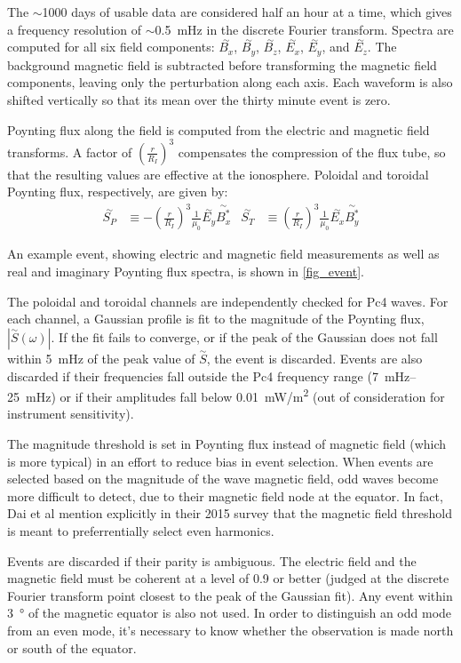 \documentclass{article}
\newcommand{\about}{\ensuremath{\sim}}
\newcommand{\dft}[1]{\ensuremath{\overset{\sim}{#1}}\xspace}
\newcommand{\lr}[1]{ \left( #1 \right) }
\renewcommand{\arg}[1]{\!\lr{#1}}
\newcommand{\mz}{\ensuremath{\mu_0}\xspace}
\begin{document}
The \about1000 days of usable data are considered half an hour at a time, which gives a frequency resolution of \about\SI{0.5}{\mHz} in the discrete Fourier transform. Spectra are computed for all six field components: \dft{B_x}, \dft{B_y}, \dft{B_z}, \dft{E_x}, \dft{E_y}, and \dft{E_z}. The background
magnetic field is subtracted before transforming the magnetic field components, leaving only the perturbation along each axis. Each waveform is also shifted vertically so that its mean over the thirty
minute event is zero.

Poynting flux along the field is computed from the electric and magnetic field transforms. A factor of $\lr{\frac{r}{R_I}}^3$ compensates the compression of the flux tube, so that the resulting values are effective at the ionosphere. Poloidal and toroidal Poynting flux, respectively, are given by:
\begin{align}
  \dft{S_P} &\equiv -\lr{\frac{r}{R_I}}^3\frac{1}{\mz} \dft{E_y} \dft{B_x^*} &
  \dft{S_T} &\equiv  \lr{\frac{r}{R_I}}^3\frac{1}{\mz} \dft{E_x} \dft{B_y^*}
\end{align}

An example event, showing electric and magnetic field measurements as well as real and imaginary Poynting flux spectra, is shown in \cref{fig_event}.

The poloidal and toroidal channels are independently checked for Pc4 waves. For each channel, a Gaussian profile is fit to the magnitude of the Poynting flux, $|\dft{S}\arg{\omega}|$. If the fit fails to converge, or if the peak of the Gaussian does not fall within \SI{5}{\mHz} of the peak value of \dft{S}, the event is discarded. Events are also discarded if their frequencies fall outside the Pc4 frequency range (\SIrange{7}{25}{\mHz}) or if their amplitudes fall below \SI{0.01}{\mW/\m\squared} (out of consideration for instrument sensitivity).

The magnitude threshold is set in Poynting flux instead of magnetic field (which is more typical) in an effort to reduce bias in event selection. When events are selected based on the magnitude of the wave magnetic field, odd waves become more difficult to detect, due to their magnetic field node at the equator. In fact, Dai et al mention explicitly in their 2015 survey that the magnetic field threshold is meant to preferrentially select even harmonics\cite{dai_2015}.

Events are discarded if their parity is ambiguous. The electric field and the magnetic field must be coherent at a level of 0.9 or better (judged at the discrete Fourier transform point closest to the peak of the Gaussian fit). Any event within \SI{3}{\degree} of the magnetic equator is also not used. In order to distinguish an odd mode from an even mode, it's necessary to know whether the observation is made north or south of the equator.
\end{document}
